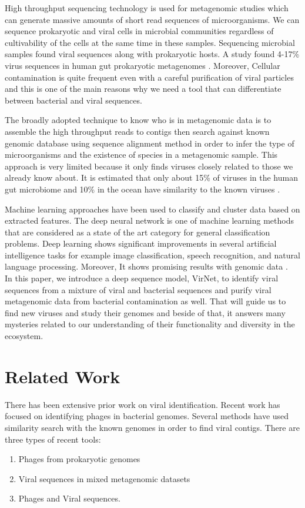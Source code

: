 \documentclass[conference]{IEEEtran}
\begin{document}
High throughput sequencing technology is used for metagenomic studies which can generate massive amounts of short read sequences of microorganisms. We can sequence  prokaryotic and viral cells in microbial communities regardless of cultivability of the cells at the same time in these samples. Sequencing microbial samples found viral sequences along with prokaryotic hosts. A study found 4-17\% virus sequences in human gut prokaryotic metagenomes \cite{minot2011human}. Moreover, Cellular contamination is quite frequent even with a careful purification of viral particles and this is one of the main reasons why we need a tool that can differentiate between bacterial and viral sequences.

The broadly adopted technique to know who is in metagenomic data is to assemble the high throughput reads to contigs then search against known genomic database using sequence alignment method in order to infer the type of microorganisms and the existence of species in a metagenomic sample. This approach is very limited because it only finds viruses closely related to those we already know about. It is estimated that only about 15\% of viruses in the human gut microbiome and 10\% in the ocean have similarity to the known viruses \cite{ren2017virfinder}. 

Machine learning approaches have been used to classify and cluster data based on extracted features. The deep neural network is one of machine learning methods that are considered as a state of the art category for general classification problems. Deep learning shows significant improvements in several artificial intelligence tasks for example image classification, speech recognition, and natural language processing. Moreover, It shows promising results with genomic data \cite{angermueller2016deep}. \\

In this paper, we introduce a deep sequence model, VirNet, to identify viral sequences from a mixture of viral and bacterial sequences and purify viral metagenomic data from bacterial contamination as well. That will guide us to find new viruses and study their genomes and beside of that, it answers many mysteries related to our understanding of their functionality and diversity in the ecosystem.

\section{Related Work}

There has been extensive prior work on viral identification. Recent work has focused on identifying phages in bacterial genomes. Several methods have used similarity search with the known genomes in order to find viral contigs. There are three types of recent tools:
\begin{enumerate}
	\item Phages from prokaryotic genomes
	\item Viral sequences in mixed metagenomic datasets
	\item Phages and Viral sequences. 
\end{enumerate} 
\end{document}
